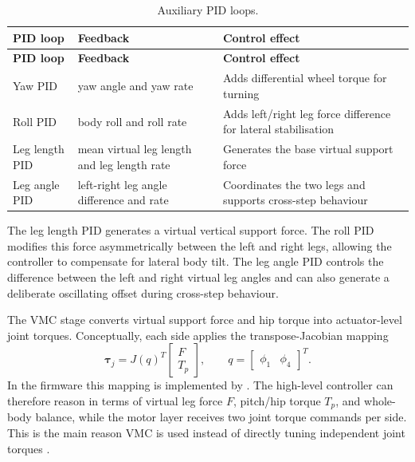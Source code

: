 \documentclass[12pt, a4paper]{article}
\begin{document}
\begingroup
\singlespacing
\small
\setlength{\tabcolsep}{2pt}
\renewcommand{\arraystretch}{1.15}
\begin{longtable}{>{\RaggedRight\arraybackslash}p{}>{\RaggedRight\arraybackslash}p{}>{\RaggedRight\arraybackslash}p{}}
\caption{Auxiliary PID loops.}\\
\toprule
\textbf{PID loop} & \textbf{Feedback} & \textbf{Control effect} \\
\midrule
\endfirsthead
\toprule
\textbf{PID loop} & \textbf{Feedback} & \textbf{Control effect} \\
\midrule
\endhead
Yaw PID & yaw angle and yaw rate & Adds differential wheel torque for turning \\
Roll PID & body roll and roll rate & Adds left/right leg force difference for lateral stabilisation \\
Leg length PID & mean virtual leg length and leg length rate & Generates the base virtual support force \\
Leg angle PID & left-right leg angle difference and rate & Coordinates the two legs and supports cross-step behaviour \\
\bottomrule
\end{longtable}
\endgroup

The leg length PID generates a virtual vertical support force. The roll PID modifies this force asymmetrically between the left and right legs, allowing the controller to compensate for lateral body tilt. The leg angle PID controls the difference between the left and right virtual leg angles and can also generate a deliberate oscillating offset during cross-step behaviour.

The VMC stage converts virtual support force and hip torque into actuator-level joint torques. Conceptually, each side applies the transpose-Jacobian mapping
\[
\boldsymbol{\tau}_{j}
= J(q)^{T}
\begin{bmatrix}
F \\
T_p
\end{bmatrix},
\qquad
q =
\begin{bmatrix}
\phi_1 & \phi_4
\end{bmatrix}^{T}.
\]
In the firmware this mapping is implemented by \texttt{}. The high-level controller can therefore reason in terms of virtual leg force \(F\), pitch/hip torque \(T_p\), and whole-body balance, while the motor layer receives two joint torque commands per side. This is the main reason VMC is used instead of directly tuning independent joint torques \cite{pratt2001vmc}.
\end{document}
